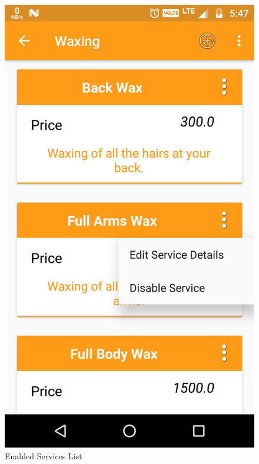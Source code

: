 \\
\begin{figure}[h]
	\centering
	\includegraphics[width=0.7\linewidth]{EnabledServicesList}
	\caption{Enabled Services List}
\end{figure}
\pagebreak

